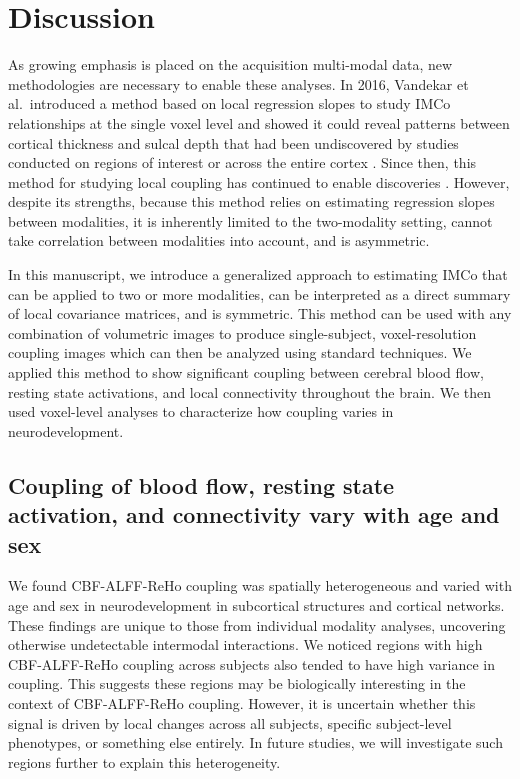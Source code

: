 \documentclass[
  12pt,
]{article}
\begin{document}
\hypertarget{discussion}{%
\section{Discussion}\label{discussion}}

As growing emphasis is placed on the acquisition multi-modal data, new methodologies are necessary to enable these analyses. In 2016, Vandekar et al.~introduced a method based on local regression slopes to study IMCo relationships at the single voxel level and showed it could reveal patterns between cortical thickness and sulcal depth that had been undiscovered by studies conducted on regions of interest or across the entire cortex \citep{vandekarSubjectlevelMeasurementLocal2016}. Since then, this method for studying local coupling has continued to enable discoveries \citep{ballerDevelopmentalCouplingCerebral2021}. However, despite its strengths, because this method relies on estimating regression slopes between modalities, it is inherently limited to the two-modality setting, cannot take correlation between modalities into account, and is asymmetric.

In this manuscript, we introduce a generalized approach to estimating IMCo that can be applied to two or more modalities, can be interpreted as a direct summary of local covariance matrices, and is symmetric. This method can be used with any combination of volumetric images to produce single-subject, voxel-resolution coupling images which can then be analyzed using standard techniques. We applied this method to show significant coupling between cerebral blood flow, resting state activations, and local connectivity throughout the brain. We then used voxel-level analyses to characterize how coupling varies in neurodevelopment.

\hypertarget{coupling-of-blood-flow-resting-state-activation-and-connectivity-vary-with-age-and-sex}{%
\subsection{Coupling of blood flow, resting state activation, and connectivity vary with age and sex}\label{coupling-of-blood-flow-resting-state-activation-and-connectivity-vary-with-age-and-sex}}

We found CBF-ALFF-ReHo coupling was spatially heterogeneous and varied with age and sex in neurodevelopment in subcortical structures and cortical networks. These findings are unique to those from individual modality analyses, uncovering otherwise undetectable intermodal interactions. We noticed regions with high CBF-ALFF-ReHo coupling across subjects also tended to have high variance in coupling. This suggests these regions may be biologically interesting in the context of CBF-ALFF-ReHo coupling. However, it is uncertain whether this signal is driven by local changes across all subjects, specific subject-level phenotypes, or something else entirely. In future studies, we will investigate such regions further to explain this heterogeneity.
\end{document}
